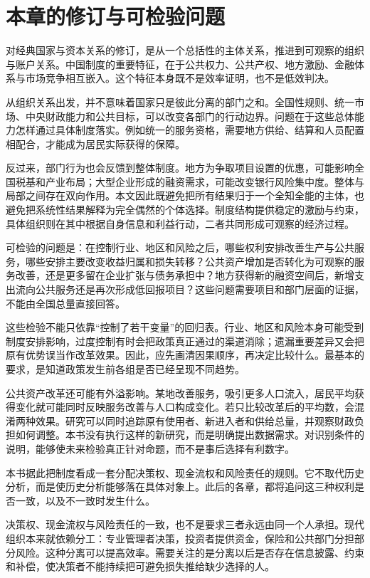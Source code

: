 \documentclass[UTF8,fontset=fandol,zihao=-4,oneside,openany]{ctexbook}
\begin{document}
\section{本章的修订与可检验问题}
对经典国家与资本关系的修订，是从一个总括性的主体关系，推进到可观察的组织与账户关系。中国制度的重要特征，在于公共权力、公共产权、地方激励、金融体系与市场竞争相互嵌入。这个特征本身既不是效率证明，也不是低效判决。

\label{arg:P034}
从组织关系出发，并不意味着国家只是彼此分离的部门之和。全国性规则、统一市场、中央财政能力和公共目标，可以改变各部门的行动边界。问题在于这些总体能力怎样通过具体制度落实。例如统一的服务资格，需要地方供给、结算和人员配置相配合，才能成为居民实际获得的保障。

反过来，部门行为也会反馈到整体制度。地方为争取项目设置的优惠，可能影响全国税基和产业布局；大型企业形成的融资需求，可能改变银行风险集中度。整体与局部之间存在双向作用。本文因此既避免把所有结果归于一个全知全能的主体，也避免把系统性结果解释为完全偶然的个体选择。制度结构提供稳定的激励与约束，具体组织则在其中根据自身信息和利益行动，二者共同形成可观察的经济过程。

可检验的问题是：在控制行业、地区和风险之后，哪些权利安排改善生产与公共服务，哪些安排主要改变收益归属和损失转移？公共资产增加是否转化为可观察的服务改善，还是更多留在企业扩张与债务承担中？地方获得新的融资空间后，新增支出流向公共服务还是再次形成低回报项目？这些问题需要项目和部门层面的证据，不能由全国总量直接回答。

\label{arg:P035}
这些检验不能只依靠“控制了若干变量”的回归表。行业、地区和风险本身可能受到制度安排影响，过度控制有时会把政策真正通过的渠道消除；遗漏重要差异又会把原有优势误当作改革效果。因此，应先画清因果顺序，再决定比较什么。最基本的要求，是知道政策发生前各组是否已经呈现不同趋势。

公共资产改革还可能有外溢影响。某地改善服务，吸引更多人口流入，居民平均获得变化就可能同时反映服务改善与人口构成变化。若只比较改革后的平均数，会混淆两种效果。研究可以同时追踪原有使用者、新进入者和供给总量，并观察财政负担如何调整。本书没有执行这样的新研究，而是明确提出数据需求。对识别条件的说明，能够使未来检验真正针对命题，而不是事后选择有利数字。

本书据此把制度看成一套分配决策权、现金流权和风险责任的规则。它不取代历史分析，而是使历史分析能够落在具体对象上。此后的各章，都将追问这三种权利是否一致，以及不一致时发生什么。

\label{arg:P036}
决策权、现金流权与风险责任的一致，也不是要求三者永远由同一个人承担。现代组织本来就依赖分工：专业管理者决策，投资者提供资金，保险和公共部门分担部分风险。这种分离可以提高效率。需要关注的是分离以后是否存在信息披露、约束和补偿，使决策者不能持续把可避免损失推给缺少选择的人。
\end{document}
